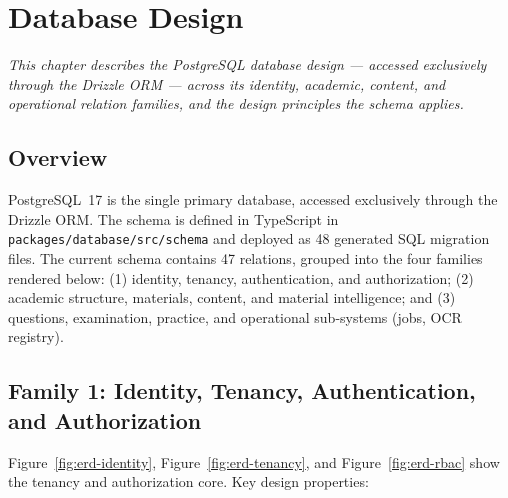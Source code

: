 \chapter{Database Design}
\label{ch:database-design}

\begin{center}
\textit{This chapter describes the PostgreSQL database design --- accessed
exclusively through the Drizzle ORM --- across its identity, academic, content,
and operational relation families, and the design principles the schema
applies.}
\end{center}

\vspace*{\fill}
\clearpage
\section{Overview}

\noindent PostgreSQL~17 is the single primary database, accessed exclusively
through the Drizzle ORM. The schema is defined in TypeScript in
\texttt{packages/database/src/schema} and deployed as 48 generated SQL
migration files. The current schema contains 47 relations, grouped into the
four families rendered below: (1) identity, tenancy, authentication, and
authorization; (2) academic structure, materials, content, and material
intelligence; and (3) questions, examination, practice, and operational
sub-systems (jobs, OCR registry).

\section{Family 1: Identity, Tenancy, Authentication, and Authorization}

\noindent Figure~\ref{fig:erd-identity}, Figure~\ref{fig:erd-tenancy}, and
Figure~\ref{fig:erd-rbac} show the tenancy and authorization core. Key design
properties:

